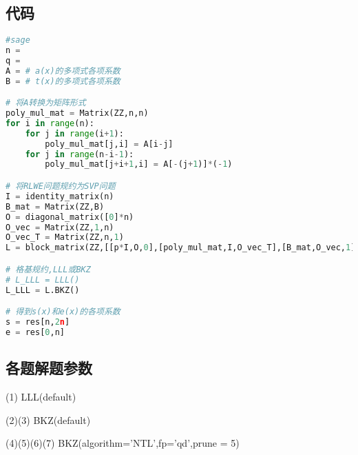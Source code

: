 \documentclass[12pt,a4paper]{article}
\numberwithin{equation}{section}
\begin{document}
\subsection{代码}

\begin{lstlisting}[language=Python]
#sage
n = 
q = 
A = # a(x)的多项式各项系数
B = # t(x)的多项式各项系数

# 将A转换为矩阵形式
poly_mul_mat = Matrix(ZZ,n,n)
for i in range(n):
    for j in range(i+1):
        poly_mul_mat[j,i] = A[i-j]
    for j in range(n-i-1):
        poly_mul_mat[j+i+1,i] = A[-(j+1)]*(-1)

# 将RLWE问题规约为SVP问题
I = identity_matrix(n)
B_mat = Matrix(ZZ,B)
O = diagonal_matrix([0]*n)
O_vec = Matrix(ZZ,1,n)
O_vec_T = Matrix(ZZ,n,1)
L = block_matrix(ZZ,[[p*I,O,0],[poly_mul_mat,I,O_vec_T],[B_mat,O_vec,1]]) # kannan embedding

# 格基规约,LLL或BKZ
# L_LLL = LLL()
L_LLL = L.BKZ()

# 得到s(x)和e(x)的各项系数
s = res[n,2n]
e = res[0,n]
\end{lstlisting}

\subsection{各题解题参数}

(1) LLL(default)

(2)(3) BKZ(default)

(4)(5)(6)(7) BKZ(algorithm='NTL',fp='qd',prune = 5)

\vspace{1em}

{\songti\fontsize{12pt}{18pt}\selectfont
	
}
%
\end{document}
